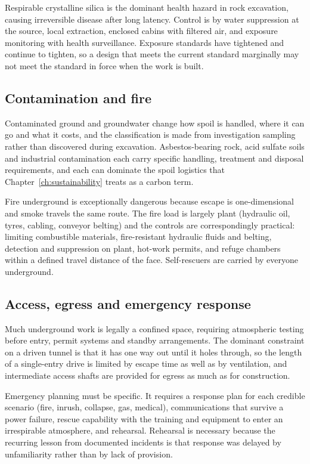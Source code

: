 Respirable crystalline silica is the dominant health hazard in rock
excavation, causing irreversible disease after long latency. Control is by
water suppression at the source, local extraction, enclosed cabins with
filtered air, and exposure monitoring with health surveillance. Exposure
standards have tightened and continue to tighten, so a design that meets
the current standard marginally may not meet the standard in force when the
work is built.

\subsection{Contamination and fire}
\label{sec:contamination-fire}

Contaminated ground and groundwater change how spoil is handled, where it can
go and what it costs, and the classification is made from investigation
sampling rather than discovered during excavation. Asbestos-bearing rock,
acid sulfate soils and industrial contamination each carry specific handling,
treatment and disposal requirements, and each can dominate the spoil logistics
that Chapter~\ref{ch:sustainability} treats as a carbon term.

Fire underground is exceptionally dangerous because escape is one-dimensional
and smoke travels the same route. The fire load is largely plant (hydraulic
oil, tyres, cabling, conveyor belting) and the controls are correspondingly
practical: limiting combustible materials, fire-resistant hydraulic fluids and
belting, detection and suppression on plant, hot-work permits, and refuge
chambers within a defined travel distance of the face. Self-rescuers are
carried by everyone underground.

\subsection{Access, egress and emergency response}
\label{sec:access-egress-emergency}

Much underground work is legally a confined space, requiring atmospheric
testing before entry, permit systems and standby arrangements. The dominant
constraint on a driven tunnel is that it has one way out until it holes
through, so the length of a single-entry drive is limited by escape time as
well as by ventilation, and intermediate access shafts are provided for
egress as much as for construction.

Emergency planning must be specific. It requires a response
plan for each credible scenario (fire, inrush, collapse, gas, medical),
communications that survive a power failure, rescue capability with the
training and equipment to enter an irrespirable atmosphere, and rehearsal.
Rehearsal is necessary because the recurring
lesson from documented incidents is that response was delayed by unfamiliarity
rather than by lack of provision.

\chapterreferences
